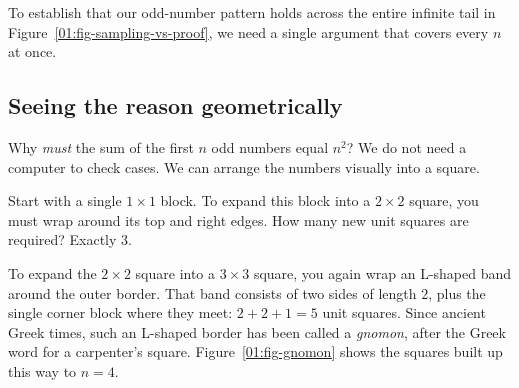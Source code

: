 To establish that our odd-number pattern holds across the entire infinite tail in Figure~\ref{01:fig-sampling-vs-proof}, we need a single argument that covers every $n$ at once.

\subsection{Seeing the reason geometrically}

Why \emph{must} the sum of the first $n$ odd numbers equal $n^2$? We do not need a computer to check cases. We can arrange the numbers visually into a square.

Start with a single $1 \times 1$ block. To expand this block into a $2 \times 2$ square, you must wrap around its top and right edges. How many new unit squares are required? Exactly $3$. 

To expand the $2 \times 2$ square into a $3 \times 3$ square, you again wrap an L-shaped band around the outer border. That band consists of two sides of length $2$, plus the single corner block where they meet: $2 + 2 + 1 = 5$ unit squares. Since ancient Greek times, such an L-shaped border has been called a \emph{gnomon}, after the Greek word for a carpenter's square. Figure~\ref{01:fig-gnomon} shows the squares built up this way to $n = 4$.

